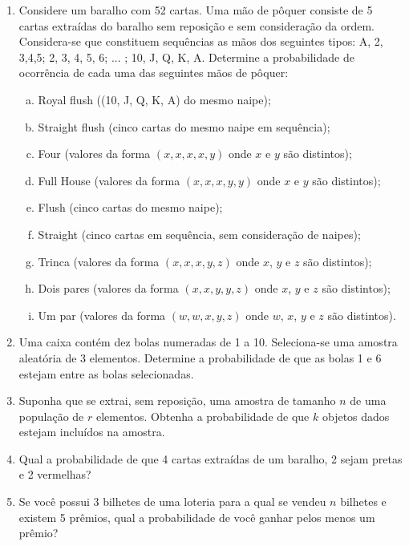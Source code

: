 \documentclass[../Notas.tex]{subfiles}
\begin{document}
\begin{enumerate}
    \item Considere um baralho com 52 cartas. Uma mão de pôquer consiste de 5 cartas extraídas do baralho sem reposição e sem consideração da ordem. Considera-se que constituem sequências as mãos dos seguintes tipos: A, 2, 3,4,5; 2, 3, 4, 5, 6; ... ; 10, J, Q, K, A. Determine a probabilidade de ocorrência de cada uma das seguintes mãos de pôquer:
    \begin{enumerate}[a)]
    \item Royal flush ((10, J, Q, K, A) do mesmo naipe);
    \item Straight flush (cinco cartas do mesmo naipe em sequência);
    \item Four (valores da forma $(x, x, x, x, y)$ onde $x$ e $y$ são distintos);
    \item Full House (valores da forma $(x, x, x, y, y)$ onde $x$ e $y$ são distintos);
    \item Flush (cinco cartas do mesmo naipe);
    \item Straight (cinco cartas em sequência, sem consideração de naipes);
    \item Trinca (valores da forma $(x, x, x, y, z)$ onde $x$, $y$ e $z$ são distintos);
    \item Dois pares (valores da forma $(x, x, y, y, z)$ onde $x$, $y$ e $z$ são distintos);
    \item Um par (valores da forma $(w, w, x, y, z)$ onde $w$, $x$, $y$ e $z$ são distintos).
    \end{enumerate}
    \item Uma caixa contém dez bolas numeradas de 1 a 10. Seleciona-se uma amostra aleatória de 3 elementos. Determine a probabilidade de que as bolas 1 e 6 estejam entre as bolas selecionadas.
    \item  Suponha que se extrai, sem reposição, uma amostra de tamanho $n$ de uma população de $r$ elementos. Obtenha a probabilidade de que $k$ objetos dados estejam incluídos na amostra.
    \item Qual a probabilidade de que 4 cartas extraídas de um baralho, 2 sejam pretas e 2 vermelhas?
    \item Se você possui 3 bilhetes de uma loteria para a qual se vendeu $n$ bilhetes e existem 5 prêmios, qual a probabilidade de você ganhar pelos menos um prêmio?
\end{enumerate}
\end{document}
